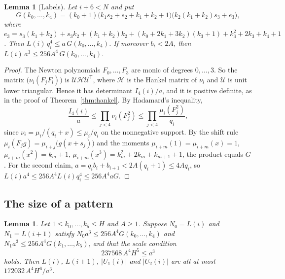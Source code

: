 \documentclass[11pt]{amsart}
\newtheorem{lemma}[theorem]{Lemma}
\theoremstyle{definition}
\theoremstyle{remark}
\begin{document}
\begin{lemma}[Labels]\label{lem:labels}
Let $i+6<N$ and put
\[
G(k_0,\dots,k_4)=(k_0+1)\bigl(k_1s_2+s_2+k_1+k_2+1\bigr)
\bigl(k_2(k_1+k_2)s_3+e_3\bigr),
\]
where $e_3=s_3(k_1+k_2)+s_3k_2+(k_1+k_2)k_2+(k_0+2k_1+3k_2)(k_3+1)+k_3^2+2k_3+k_4+1$. Then
$L(i)\,q_i^4\le a\,G(k_0,\dots,k_4)$. If moreover $b_i<2A$, then
$L(i)\,a^3\le 256A^4\,G(k_0,\dots,k_4)$.
\end{lemma}

\begin{proof}
The Newton polynomials $F_0,\dots,F_3$ are monic of degrees $0,\dots,3$. So the matrix
$\bigl(\nu_i(F_jF_l)\bigr)$ is $\mathcal U\mathcal H\mathcal U^{\mathsf T}$, where $\mathcal H$ is the Hankel matrix of $\nu_i$ and $\mathcal U$ is unit
lower triangular. Hence it has determinant $I_4(i)/a$, and it is positive definite, as in the
proof of Theorem~\ref{thm:hankel}. By Hadamard's inequality,
\[
\frac{I_4(i)}a\le\prod_{j<4}\nu_i(F_j^2)\le\prod_{j<4}\frac{\mu_i(F_j^2)}{q_i},
\]
since $\nu_i=\mu_i/(q_i+x)\le\mu_i/q_i$ on the nonnegative support. By the shift rule
$\mu_i(F_jg)=\mu_{i+j}\bigl(g(x+s_j)\bigr)$ and the moments $\mu_{i+m}(1)=\mu_{i+m}(x)=1$,
$\mu_{i+m}(x^2)=k_m+1$, $\mu_{i+m}(x^3)=k_m^2+2k_m+k_{m+1}+1$, the product equals $G$. For the second
claim, $a=q_ib_i+b_{i+1}<2A(q_i+1)\le4Aq_i$, so $L(i)a^4\le256A^4L(i)q_i^4\le 256A^4aG$.
\end{proof}

\subsection{The size of a pattern}

\begin{lemma}\label{lem:psize}
Let $1\le k_0,\dots,k_5\le H$ and $A\ge1$. Suppose $N_0=L(i)$ and $N_1=L(i+1)$ satisfy
$N_0a^3\le256A^4G(k_0,\dots,k_4)$ and $N_1a^3\le256A^4G(k_1,\dots,k_5)$, and that the
\emph{scale condition}
\begin{equation}\label{eq:scale}
237568\,A^4H^5\le a^3
\end{equation}
holds. Then $L(i)$, $L(i+1)$, $|U_1(i)|$ and $|U_2(i)|$ are all at most $172032\,A^4H^6/a^3$.
\end{lemma}
\end{document}
